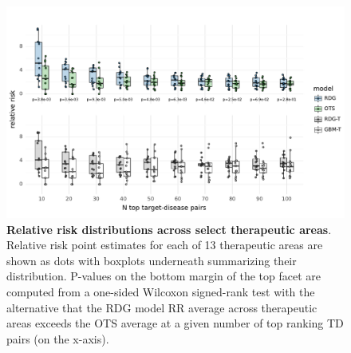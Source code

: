 \documentclass{article}
\begin{document}
\pagebreak

\begin{figure}[H]
  \centering
  \captionsetup{width=.9\linewidth}
  \includegraphics[width=1\textwidth]{relative_risk_dist_across_ta.pdf}
  \caption{
    \textbf{Relative risk distributions across select therapeutic areas}.
    Relative risk point estimates for each of 13 therapeutic areas are shown as dots with boxplots underneath summarizing their distribution. P-values on the bottom margin of the top facet are computed from a one-sided Wilcoxon signed-rank test with the alternative that the RDG model RR average across therapeutic areas exceeds the OTS average at a given number of top ranking TD pairs (on the x-axis).
  }
  \label{fig:relative_risk_dist_across_ta}
\end{figure}

\pagebreak
\end{document}
